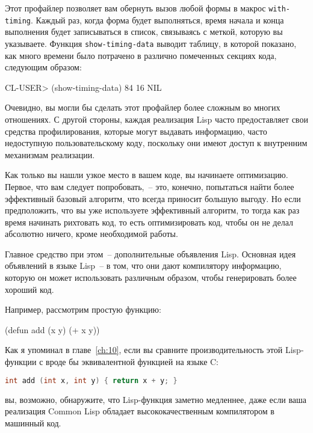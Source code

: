 Этот профайлер позволяет вам обернуть вызов любой формы в макрос
\lstinline{with-timing}. Каждый раз, когда форма будет выполняться, время начала и конца
выполнения будет записываться в список, связываясь с меткой, которую вы
указываете. Функция \lstinline{show-timing-data} выводит таблицу, в которой показано, как много
времени было потрачено в различно помеченных секциях кода, следующим образом:

\begin{myverb}
CL-USER> (show-timing-data)
 84%
 16%
NIL
\end{myverb}

Очевидно, вы могли бы сделать этот профайлер более сложным во многих отношениях. С другой
стороны, каждая реализация Lisp часто предоставляет свои средства профилирования, которые
могут выдавать информацию, часто недоступную пользовательскому коду, поскольку они имеют
доступ к внутренним механизмам реализации.

Как только вы нашли узкое место в вашем коде, вы начинаете оптимизацию. Первое, что вам
следует попробовать,~-- это, конечно, попытаться найти более эффективный базовый алгоритм,
что всегда приносит большую выгоду.  Но если предположить, что вы уже используете
эффективный алгоритм, то тогда как раз время начинать рихтовать код, то есть
оптимизировать код, чтобы он не делал абсолютно ничего, кроме необходимой работы.

Главное средство при этом~-- дополнительные объявления Lisp. Основная идея объявлений в
языке Lisp~-- в том, что они дают компилятору информацию, которую он может использовать
различным образом, чтобы генерировать более хороший код.

Например, рассмотрим простую функцию:

\begin{myverb}
(defun add (x y) (+ x y))
\end{myverb}

Как я упоминал в главе~\ref{ch:10}, если вы сравните производительность этой Lisp-функции
с вроде бы эквивалентной функцией на языке C:

\begin{lstlisting}[language=C]
int add (int x, int y) { return x + y; }
\end{lstlisting}

\noindent{}вы, возможно, обнаружите, что Lisp-функция заметно медленнее, даже если ваша
реализация Common Lisp обладает высококачественным компилятором в машинный код.

